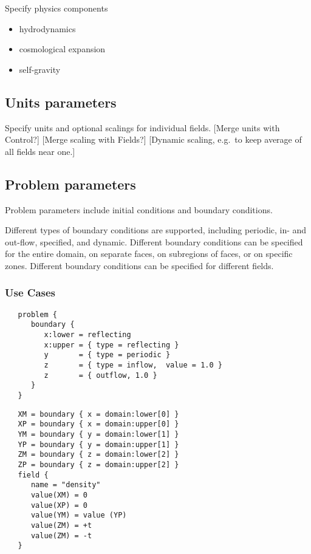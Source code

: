 Specify physics components

\begin{itemize}
\item hydrodynamics
\item  cosmological expansion
\item self-gravity
\end{itemize}


\subsection{Units parameters} \label{ss:params-units}


 Specify units and optional scalings for individual
 fields.  [Merge units with Control?] [Merge scaling with Fields?] 
 [Dynamic scaling, e.g.~to keep average of all fields near one.]

\subsection{Problem parameters} \label{ss:parms-problem}

Problem parameters include initial conditions and boundary conditions.

Different types of boundary conditions are supported, including
periodic, in- and out-flow, specified, and dynamic.  Different
boundary conditions can be specified for the entire domain, on
separate faces, on subregions of faces, or on specific zones.
Different boundary conditions can be specified for different fields.

\subsubsection{Use Cases}

\begin{verbatim}
   problem {
      boundary {
         x:lower = reflecting
         x:upper = { type = reflecting }
         y       = { type = periodic }
         z       = { type = inflow,  value = 1.0 }
         z       = { outflow, 1.0 }
      }
   }
\end{verbatim}

\begin{verbatim}
   XM = boundary { x = domain:lower[0] }
   XP = boundary { x = domain:upper[0] }
   YM = boundary { y = domain:lower[1] }
   YP = boundary { y = domain:upper[1] }
   ZM = boundary { z = domain:lower[2] }
   ZP = boundary { z = domain:upper[2] }
   field {
      name = "density"
      value(XM) = 0
      value(XP) = 0
      value(YM) = value (YP)
      value(ZM) = +t
      value(ZM) = -t
   }
\end{verbatim}

